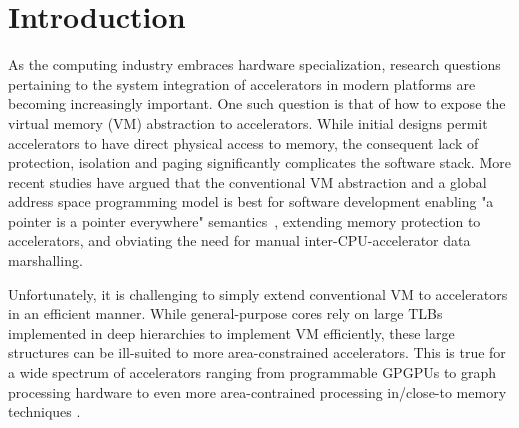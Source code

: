 \section{Introduction}
\label{sec:intro}
As the computing industry embraces hardware specialization, research
questions pertaining to the system integration of accelerators in
modern platforms are becoming increasingly important. One such
question is that of how to expose the virtual memory (VM) abstraction
to accelerators. While initial designs permit accelerators to have
direct physical access to memory, the consequent lack of protection,
isolation and paging significantly complicates the software
stack. More recent studies have argued that the conventional VM
abstraction and a global address space programming model is best for
software development enabling "a pointer is a pointer everywhere"
semantics~\cite{pichai:architectural, power:supporting,
  haria:devirtualizing, vesely:observation, ausavarungnirun:mosaic},
extending memory protection to accelerators, and obviating the need
for manual inter-CPU-accelerator data marshalling.

Unfortunately, it is challenging to simply extend conventional VM to
accelerators in an efficient manner. While general-purpose cores rely
on large TLBs implemented in deep hierarchies to implement VM
efficiently, these large structures can be ill-suited to more
area-constrained accelerators. This is true for a wide spectrum of
accelerators ranging from programmable GPGPUs
\cite{pichai:architectural, power:supporting} to graph processing
hardware \cite{haria:devirtualizing} to even more area-contrained
processing in/close-to memory techniques \cite{picorel:near-memory}.

